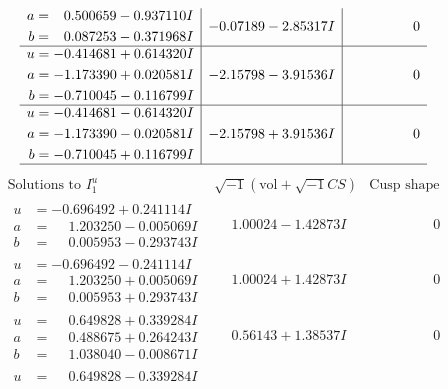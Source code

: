 \documentclass[1p]{elsarticle_modified}
\theoremstyle{definition}
\newcommand{\I}{\sqrt{-1}}
\begin{document}
$$\begin{array}{c|c|c}
\begin{aligned}
a &= \phantom{-}0.500659 - 0.937110 I \\
b &= \phantom{-}0.087253 - 0.371968 I\end{aligned}
 & -0.07189 - 2.85317 I & \phantom{-0.000000 } 0 \\ \hline\begin{aligned}
u &= -0.414681 + 0.614320 I \\
a &= -1.173390 + 0.020581 I \\
b &= -0.710045 - 0.116799 I\end{aligned}
 & -2.15798 - 3.91536 I & \phantom{-0.000000 } 0 \\ \hline\begin{aligned}
u &= -0.414681 - 0.614320 I \\
a &= -1.173390 - 0.020581 I \\
b &= -0.710045 + 0.116799 I\end{aligned}
 & -2.15798 + 3.91536 I & \phantom{-0.000000 } 0\\
 \hline 
 \end{array}$$\newpage$$\begin{array}{c|c|c}  
\text{Solutions to }I^u_{1}& \I (\text{vol} + \sqrt{-1}CS) & \text{Cusp shape}\\
 \hline 
\begin{aligned}
u &= -0.696492 + 0.241114 I \\
a &= \phantom{-}1.203250 - 0.005069 I \\
b &= \phantom{-}0.005953 - 0.293743 I\end{aligned}
 & \phantom{-}1.00024 - 1.42873 I & \phantom{-0.000000 } 0 \\ \hline\begin{aligned}
u &= -0.696492 - 0.241114 I \\
a &= \phantom{-}1.203250 + 0.005069 I \\
b &= \phantom{-}0.005953 + 0.293743 I\end{aligned}
 & \phantom{-}1.00024 + 1.42873 I & \phantom{-0.000000 } 0 \\ \hline\begin{aligned}
u &= \phantom{-}0.649828 + 0.339284 I \\
a &= \phantom{-}0.488675 + 0.264243 I \\
b &= \phantom{-}1.038040 - 0.008671 I\end{aligned}
 & \phantom{-}0.56143 + 1.38537 I & \phantom{-0.000000 } 0 \\ \hline\begin{aligned}
u &= \phantom{-}0.649828 - 0.339284 I \\

\end{aligned}
\end{array}$$
\end{document}
